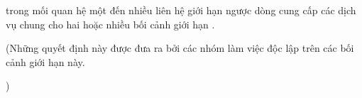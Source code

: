 
trong mối quan hệ một đến nhiều liên hệ giới hạn ngược dòng cung cấp các dịch vụ chung cho hai hoặc nhiều bối cảnh giới hạn .



(Những quyết định này được đưa ra bởi các nhóm làm việc độc lập trên các bối cảnh giới hạn này.

)




